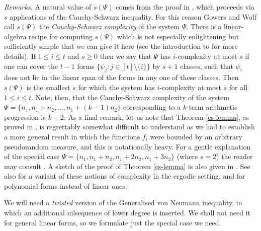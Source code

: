 \documentclass[11pt,reqno]{amsart}
\numberwithin{equation}{section}
\theoremstyle{plain}
\theoremstyle{definition}
\renewcommand{\leq}{\leqslant}
\renewcommand{\geq}{\geqslant}
\newcommand\1{{\bf 1}}
\newcommand\2{{\bf 2}}
\begin{document}
\emph{Remarks.} A natural value of $s(\Psi)$ comes from the proof in \cite{green-tao-linearprimes}, which proceeds via $s$ applications of the Cauchy-Schwarz inequality. For this reason Gowers and Wolf \cite{gowers-wolf-1} call $s(\Psi)$ the \emph{Cauchy-Schwarz complexity} of the system $\Psi$. There is a linear-algebra recipe for computing $s(\Psi)$ which is not especially enlightening but sufficiently simple that we can give it here (see the introduction to \cite{green-tao-linearprimes} for more details). If $1 \leq i \leq t$ and $s \geq 0$ then we say that $\Psi$ has $i$-complexity at most $s$ if one can cover the $t-1$ forms $\{\psi_j : j \in [t] \setminus \{i\}\}$ by $s+1$ classes, such that $\psi_i$ does not lie in the linear span of the forms in any one of these classes. Then $s(\Psi)$ is the smallest $s$ for which the system has $i$-complexity at most $s$ for all $1 \leq i \leq t$. Note, then, that the Cauchy-Schwarz complexity of the system $\Psi = \{n_1, n_1 + n_2, \dots, n_1 + (k-1)n_2\}$ corresponding to a $k$-term arithmetic progression is $k-2$. As a final remark, let us note that Theorem \ref{cs-lemma}, as proved in \cite[Appendix C]{green-tao-linearprimes}, is regrettably somewhat difficult to understand as we had to establish a more general result in which the functions $f_i$ were bounded by an arbitrary pseudorandom measure, and this is notationally heavy. For a gentle explanation of the special case $\Psi = \{n_1, n_1 + n_2, n_1 + 2n_2, n_1 + 3n_2\}$ (where $s = 2$) the reader may consult \cite[Proposition 1.11]{green-montreal}.  A sketch of the proof of Theorem \ref{cs-lemma} is also given in \cite[\S 2]{gowers-wolf-1}.  See also \cite{leib-orbits} for a variant of these notions of complexity in the ergodic setting, and for polynomial forms instead of linear ones.

We will need a \emph{twisted} version of the Generalised von Neumann inequality, in which an additional nilsequence of lower degree is inserted. We shall not need it for general linear forms, so we formulate just the special case we need.
\end{document}
